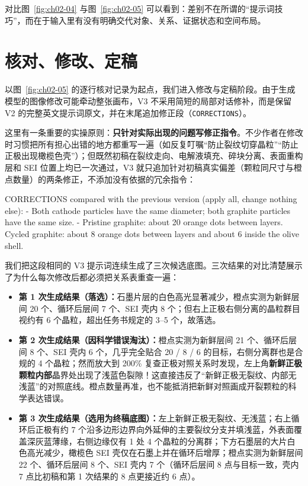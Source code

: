 对比图~\ref{fig:ch02-04} 与图~\ref{fig:ch02-05} 可以看到：差别不在所谓的“提示词技巧”，而在于输入里有没有明确交代对象、关系、证据状态和空间布局。

\section{核对、修改、定稿}

以图~\ref{fig:ch02-05} 的逐行核对记录为起点，我们进入修改与定稿阶段。由于生成模型的图像修改可能牵动整张画布，V3 不采用简短的局部对话修补，而是保留 V2 的完整英文提示词原文，并在末尾追加修正段（\texttt{CORRECTIONS}）。

这里有一条重要的实操原则：\textbf{只针对实际出现的问题写修正指令}。不少作者在修改时习惯把所有担心出错的地方都重写一遍（如反复叮嘱“防止裂纹切穿晶粒”“防止正极出现橄榄色壳”）；但既然初稿在裂纹走向、电解液填充、碎块分离、表面重构层和 SEI 位置上均已一次通过，V3 就只追加针对初稿真实偏差（颗粒同尺寸与橙点数量）的两条修正，不添加没有依据的冗余指令：

\begin{Prompt}

CORRECTIONS compared with the previous version (apply all, change nothing else):
- Both cathode particles have the same diameter; both graphite particles have
  the same size.
- Pristine graphite: about 20 orange dots between layers. Cycled graphite: about
  8 orange dots between layers and about 6 inside the olive shell.
\end{Prompt}

我们把这段相同的 V3 提示词连续生成了三次候选底图。三次结果的对比清楚展示了为什么每次修改后都必须把关系表重查一遍：

\begin{itemize}
\item \textbf{第 1 次生成结果（落选）：}石墨片层的白色高光显著减少，橙点实测为新鲜层间 20 个、循环后层间 7 个、SEI 壳内 8 个；但右上正极右侧分离的晶粒群目视约有 6 个晶粒，超出任务书规定的 3–5 个，故落选。
\item \textbf{第 2 次生成结果（因科学错误淘汰）：}橙点实测为新鲜层间 21 个、循环后层间 8 个、SEI 壳内 6 个，几乎完全贴合 20 / 8 / 6 的目标，右侧分离群也是合规的 4 个晶粒；然而放大到 200\% 复查正极对照关系时发现，左上角\textbf{新鲜正极颗粒内部}晶界处出现了浅蓝色裂隙！这直接违反了“新鲜正极无裂纹、内部无浅蓝”的对照底线。橙点数量再准，也不能抵消把新鲜对照画成开裂颗粒的科学表达错误。
\item \textbf{第 3 次生成结果（选用为终稿底图）：}左上新鲜正极无裂纹、无浅蓝；右上循环后正极有约 7 个沿多边形边界向外延伸的主要裂纹分支并填浅蓝，外表面覆盖深灰蓝薄缘，右侧边缘仅有 1 处 4 个晶粒的分离群；下方石墨层的大片白色高光减少，橄榄色 SEI 壳仅在石墨上并在循环后增厚；橙点实测为新鲜层间 22 个、循环后层间 8 个、SEI 壳内 7 个（循环后层间 8 点与目标一致，壳内 7 点比初稿和第 1 次结果的 8 点更接近约 6 点）。
\end{itemize}


